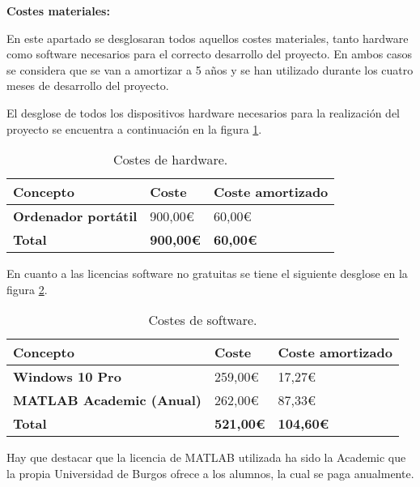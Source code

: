 \textbf{Costes materiales:}

En este apartado se desglosaran todos aquellos costes materiales, tanto hardware como software necesarios para el correcto desarrollo del proyecto. En ambos casos se considera que se van a amortizar a 5 años y se han utilizado durante los cuatro meses de desarrollo del proyecto.

El desglose de todos los dispositivos hardware necesarios para la realización del proyecto se encuentra a continuación en la figura \ref{tabla:costes-de-hardware}.

\begin{table}[h!]
    \centering
    \begin{tabular}{l l l}
        \hline
        \textbf{Concepto}               & \textbf{Coste}    & \textbf{Coste amortizado} \\
        \hline
        \textbf{Ordenador portátil}     & 900,00€           & 60,00€                    \\
        \hline
        \textbf{Total}                  & \textbf{900,00€}  & \textbf{60,00€}           \\
        \hline
    \end{tabular}
    \caption{Costes de hardware.}\label{tabla:costes-de-hardware}
\end{table}

En cuanto a las licencias software no gratuitas se tiene el siguiente desglose en la figura \ref{tabla:costes-de-software}.

\begin{table}[h!]
    \centering
    \begin{tabular}{l l l}
        \hline
        \textbf{Concepto}                   & \textbf{Coste}        & \textbf{Coste amortizado} \\
        \hline
        \textbf{Windows 10 Pro}             & 259,00€               & 17,27€                    \\
        \textbf{MATLAB Academic (Anual)}    & 262,00€               & 87,33€                    \\
        \hline
        \textbf{Total}                      & \textbf{521,00€}      & \textbf{104,60€}          \\
        \hline
    \end{tabular}
    \caption{Costes de software.}\label{tabla:costes-de-software}
\end{table}

Hay que destacar que la licencia de MATLAB utilizada ha sido la Academic que la propia Universidad de Burgos ofrece a los alumnos, la cual se paga anualmente.

